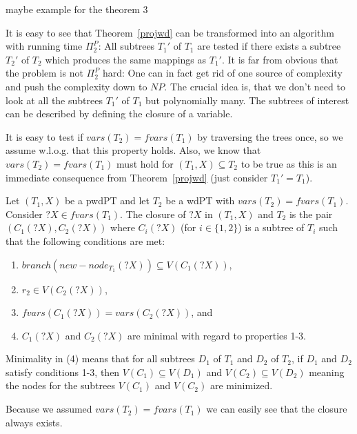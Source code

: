 \begin{example}
	maybe example for the theorem 3
\end{example}

It is easy to see that Theorem~\ref{projwd} can be transformed into an algorithm
with running time $\Pi^P_2$: All subtrees $T_1'$ of $T_1$ are tested if there
exists a subtree $T_2'$ of $T_2$ which produces the same mappings as $T_1'$.
It is far from obvious that the problem is not $\Pi^P_2$ hard: One can in fact
get rid of one source of complexity and push the complexity down to $NP$.
The crucial idea is, that we don't need to look at all the subtrees $T_1'$ of
$T_1$ but polynomially many. The subtrees of interest can be described by
defining the closure of a variable.

It is easy to test if $vars(T_2) = fvars(T_1)$ by traversing the trees once, so
we assume w.l.o.g. that this property holds. Also, we know that $vars(T_2) =
fvars(T_1)$ must hold for $(T_1,X) \subseteq T_2$ to be true as this is an
immediate consequence from Theorem~\ref{projwd} (just consider $T_1' = T_1$).

\begin{definition}
	Let $(T_1,X)$ be a pwdPT and let $T_2$ be a wdPT with
	$vars(T_2) = fvars(T_1)$. Consider $?X \in fvars(T_1)$. The closure
	of $?X$ in $(T_1,X)$ and $T_2$ is the pair $(C_1(?X),C_2(?X))$ where
	$C_i(?X)$ (for $i \in \{1,2\}$) is a subtree of $T_i$ such that the
	following conditions are met:
	\begin{enumerate}
		\item $branch(new-node_{T_1}(?X)) \subseteq V(C_1(?X))$,
		\item $r_2 \in V(C_2(?X))$,
		\item $fvars(C_1(?X)) = vars(C_2(?X))$, and
		\item $C_1(?X)$ and $C_2(?X)$ are minimal with regard to properties 1-3.
	\end{enumerate}
	Minimality in (4) means that for all subtrees $D_1$ of $T_1$ and $D_2$ of
	$T_2$, if $D_1$ and $D_2$ satisfy conditions 1-3, then $V(C_1) \subseteq
	V(D_1)$ and $V(C_2) \subseteq V(D_2)$ meaning the nodes for the subtrees
	$V(C_1)$ and $V(C_2)$ are minimized.
\end{definition}

Because we assumed $vars(T_2) = fvars(T_1)$ we can easily see that the closure
always exists. 

